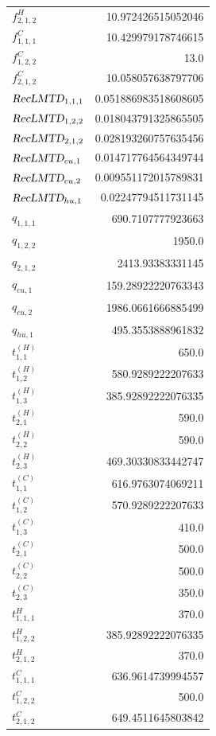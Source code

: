 \documentclass{article}%
\begin{document}
\begin{multicols*}{3}
\begin{supertabular}{lr}
	$f_{2,1,2}^{H}$ & 10.972426515052046 \\%
	$f_{1,1,1}^{C}$ & 10.429979178746615 \\%
	$f_{1,2,2}^{C}$ & 13.0 \\%
	$f_{2,1,2}^{C}$ & 10.058057638797706 \\%
	$\textsl{RecLMTD}_{1,1,1}$ & 0.051886983518608605 \\%
	$\textsl{RecLMTD}_{1,2,2}$ & 0.018043791325865505 \\%
	$\textsl{RecLMTD}_{2,1,2}$ & 0.028193260757635456 \\%
	$\textsl{RecLMTD}_{cu,1}$ & 0.014717764564349744 \\%
	$\textsl{RecLMTD}_{cu,2}$ & 0.009551172015789831 \\%
	$\textsl{RecLMTD}_{hu,1}$ & 0.02247794511731145 \\%
	$q_{1,1,1}$ & 690.7107777923663 \\%
	$q_{1,2,2}$ & 1950.0 \\%
	$q_{2,1,2}$ & 2413.93383331145 \\%
	$q_{cu,1}$ & 159.28922220763343 \\%
	$q_{cu,2}$ & 1986.0661666885499 \\%
	$q_{hu,1}$ & 495.3553888961832 \\%
	$t_{1,1}^{(H)}$ & 650.0 \\%
	$t_{1,2}^{(H)}$ & 580.9289222207633 \\%
	$t_{1,3}^{(H)}$ & 385.92892222076335 \\%
	$t_{2,1}^{(H)}$ & 590.0 \\%
	$t_{2,2}^{(H)}$ & 590.0 \\%
	$t_{2,3}^{(H)}$ & 469.30330833442747 \\%
	$t_{1,1}^{(C)}$ & 616.9763074069211 \\%
	$t_{1,2}^{(C)}$ & 570.9289222207633 \\%
	$t_{1,3}^{(C)}$ & 410.0 \\%
	$t_{2,1}^{(C)}$ & 500.0 \\%
	$t_{2,2}^{(C)}$ & 500.0 \\%
	$t_{2,3}^{(C)}$ & 350.0 \\%
	$t_{1,1,1}^{H}$ & 370.0 \\%
	$t_{1,2,2}^{H}$ & 385.92892222076335 \\%
	$t_{2,1,2}^{H}$ & 370.0 \\%
	$t_{1,1,1}^{C}$ & 636.9614739994557 \\%
	$t_{1,2,2}^{C}$ & 500.0 \\%
	$t_{2,1,2}^{C}$ & 649.4511645803842 \\%

\end{supertabular}
\end{multicols*}
\end{document}
